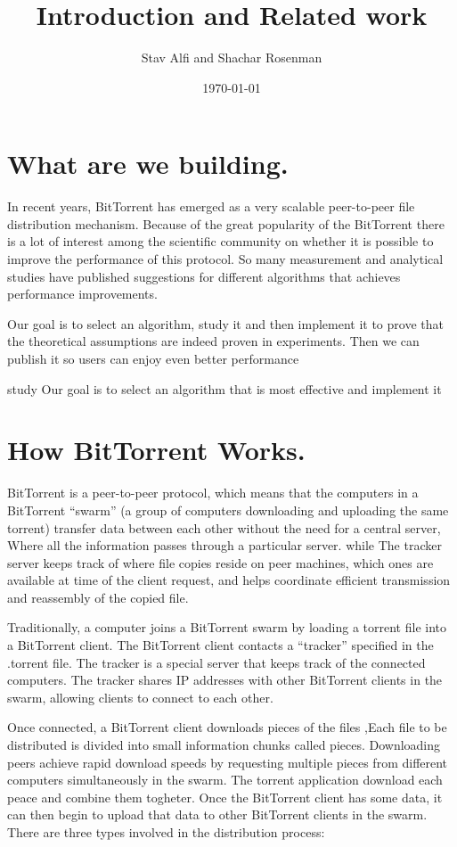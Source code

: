 \documentclass[11pt]{article}
\title{{\Huge   Introduction and Related work}}
\author{Stav Alfi and Shachar Rosenman}
\date{\today}
\begin{document}
\maketitle


\section*{What are we building.}
In recent years, BitTorrent has emerged as a very scalable peer-to-peer file distribution mechanism.
Because of the great popularity of the BitTorrent there is a lot of interest among the scientific community on whether it is possible to improve the performance of this protocol.
  So many measurement and analytical studies have published suggestions for different algorithms that achieves performance improvements.


Our goal is to select an algorithm, study it and then implement it to prove that the theoretical assumptions are indeed proven in experiments. Then we can publish it so users can enjoy even better performance

study
Our goal is to select an algorithm that is most effective and implement it

\section*{How BitTorrent Works.}
BitTorrent is a peer-to-peer protocol, which means that the computers in a BitTorrent “swarm” (a group of computers downloading and uploading the same torrent) transfer data between each other without the need for a central server, Where all the information passes through a particular server.
while  The tracker server keeps track of where file copies reside on peer machines, which ones are available at time of the client request, and helps coordinate efficient transmission and reassembly of the copied file.

Traditionally, a computer joins a BitTorrent swarm by loading a torrent file into a BitTorrent client. The BitTorrent client contacts a “tracker” specified in the .torrent file. The tracker is a special server that keeps track of the connected computers. The tracker shares IP addresses with other BitTorrent clients in the swarm, allowing clients to connect to each other.


Once connected, a BitTorrent client downloads pieces of the files ,Each file to be distributed is divided into small information chunks called pieces. Downloading peers achieve rapid download speeds by requesting multiple pieces from different computers simultaneously in the swarm.
The torrent
application download each peace and combine them togheter. Once the BitTorrent client has some data, it can then begin to upload that data to other BitTorrent clients in the swarm. There are three types involved in the distribution process:
\end{document}
